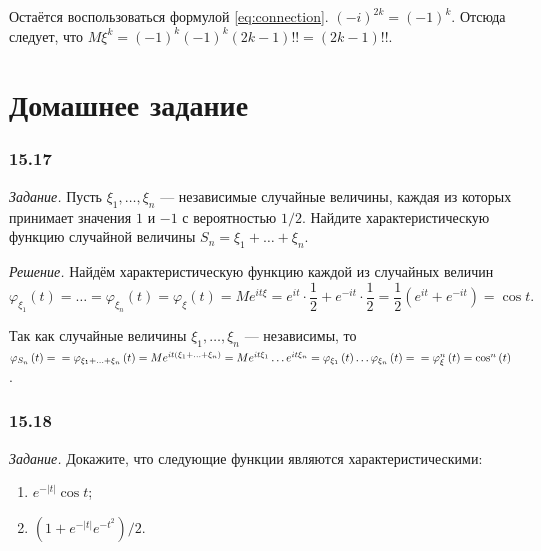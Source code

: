 Остаётся воспользоваться формулой \eqref{eq:connection}.
$ \left( -i \right)^{2k} =
  \left( -1 \right)^k$.
Отсюда следует,
что
$M \xi^k =
  \left( -1 \right)^k \left( -1 \right)^k \left( 2k - 1 \right)!! =
  \left( 2k - 1 \right)!!$.

\section*{Домашнее задание}

\subsubsection*{15.17}

\textit{Задание.}
Пусть $ \xi_1, \dotsc, \xi_n$ --- независимые случайные величины,
каждая из которых принимает значения $1$ и $- 1$ с вероятностью $1 / 2$.
Найдите характеристическую функцию случайной величины $S_n = \xi_1 + \dotsc + \xi_n$.

\textit{Решение.} Найдём характеристическую функцию каждой из случайных величин
$$ \varphi_{ \xi_1} \left( t \right) =
  \dotsc =
  \varphi_{ \xi_n} \left( t \right) =
  \varphi_{ \xi } \left( t \right) =
  Me^{it \xi } =
  e^{it} \cdot \frac{1}{2} + e^{- it} \cdot \frac{1}{2} =
  \frac{1}{2} \left( e^{it} + e^{- it} \right) =
  \cos t.$$

Так как случайные величины $ \xi_1, \dotsc, \xi_n$ --- независимы,
то
$ \varphi_{S_n} \left( t \right) = \\
  = \varphi_{ \xi_1 + \dotsc + \xi_n} \left( t \right) =
  Me^{it \left( \xi_1 + \dotsc + \xi_n \right) } =
  Me^{it \xi_1} \dotsc e^{it \xi_n} =
  \varphi_{ \xi_1} \left( t \right) \dotsc \varphi_{ \xi_n} \left( t \right) = \\
  = \varphi_{ \xi}^n \left( t \right) =
  \cos^n \left( t \right) $.

\subsubsection*{15.18}

\textit{Задание.} Докажите, что следующие функции являются характеристическими:
\begin{enumerate}[label=\alph*)]
\item $e^{- \left| t \right| } \cos t$;
\item $ \left( 1 + e^{- \left| t \right| }e^{- t^2} \right) / 2$.
\end{enumerate}

